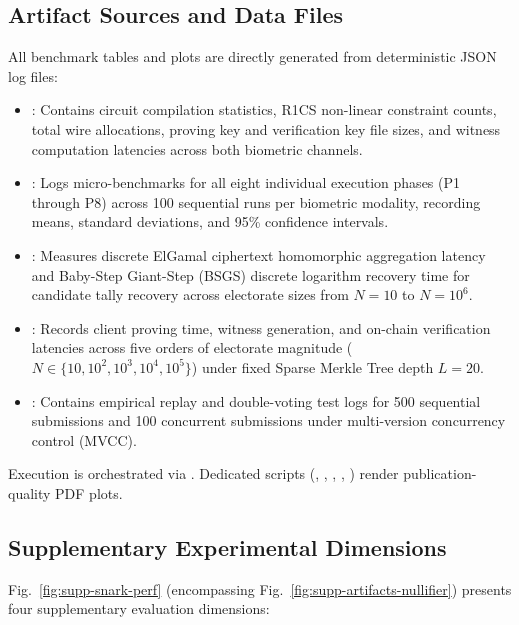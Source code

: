 \documentclass[10pt,letterpaper,journal]{IEEEtran}
\begin{document}
\subsection{Artifact Sources and Data Files}
All benchmark tables and plots are directly generated from deterministic JSON log files:
\begin{itemize}[leftmargin=*,noitemsep]
  \item {}: Contains circuit compilation statistics, R1CS non-linear constraint counts, total wire allocations, proving key and verification key file sizes, and witness computation latencies across both biometric channels.
  \item {}: Logs micro-benchmarks for all eight individual execution phases (P1 through P8) across 100 sequential runs per biometric modality, recording means, standard deviations, and 95\% confidence intervals.
  \item {}: Measures discrete ElGamal ciphertext homomorphic aggregation latency and Baby-Step Giant-Step (BSGS) discrete logarithm recovery time for candidate tally recovery across electorate sizes from $N = 10$ to $N = 10^6$.
  \item {}: Records client proving time, witness generation, and on-chain verification latencies across five orders of electorate magnitude ($N \in \{10, 10^2, 10^3, 10^4, 10^5\}$) under fixed Sparse Merkle Tree depth $L=20$.
  \item {}: Contains empirical replay and double-voting test logs for 500 sequential submissions and 100 concurrent submissions under multi-version concurrency control (MVCC).
\end{itemize}
Execution is orchestrated via . Dedicated scripts (, , , , ) render publication-quality PDF plots.

\subsection{Supplementary Experimental Dimensions}
Fig.~\ref{fig:supp-snark-perf} (encompassing Fig.~\ref{fig:supp-artifacts-nullifier}) presents four supplementary evaluation dimensions:
\end{document}
